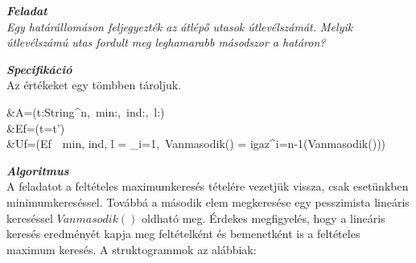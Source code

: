 \documentclass[12pt,a4paper]{article}			%
\newcommand{\fejezet}[1]{\noindent \textbf{\textit{\large #1 \vspace{5mm}}}}
\begin{document}
	
	\fejezet{Feladat}\\
	\textit{Egy határállomáson feljegyezték az átlépő utasok útlevélszámát. Melyik útlevélszámú
	utas fordult meg leghamarabb másodszor a határon?}
	\vspace{5mm}

	\fejezet{Specifikáció}\\
	Az értékeket egy tömbben tároljuk. 
		\begin{flalign*}
			&A=(t:String^n,~min:\mathbb{N},~ind:,~l:)\\
			&Ef=(t=t')\\
			&Uf=(Ef~\wedge~min, ind, l = \min _{i=1,~Vanmasodik() = igaz}^{i=n-1}(Vanmasodik()))
		\end{flalign*}
	
	\fejezet{Algoritmus}\\
	A feladatot a feltételes maximumkeresés tételére vezetjük vissza, csak esetünkben minimumkereséssel. Továbbá a második elem megkeresése egy pesszimista lineáris kereséssel $Vanmasodik()$ oldható meg. Érdekes megfigyelés, hogy a lineáris keresés eredményét kapja meg feltételként és bemenetként is a feltételes maximum keresés. A struktogrammok az alábbiak: \vspace{5mm}\\
		\noindent\hfill
		\begin{stukibox}[6cm]
		\end{stukibox}
		\hfill
		\begin{stukibox}[4cm]
		\end{stukibox}
		\hfill{}
\end{document}
